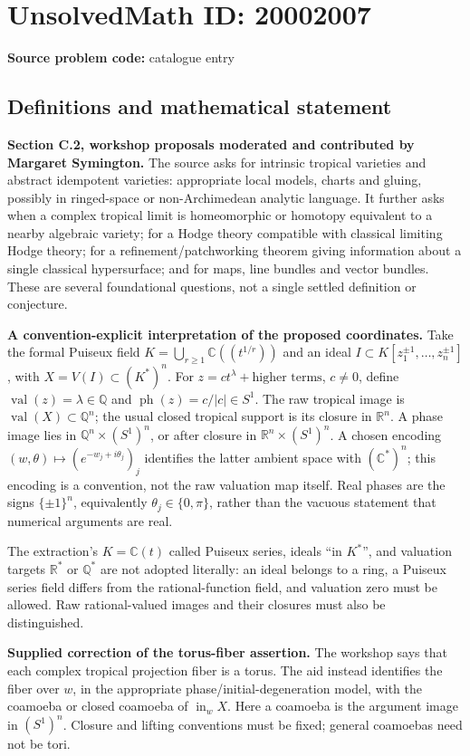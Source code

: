\documentclass[11pt]{article}
\newcommand{\Q}{\mathbb{Q}}
\newcommand{\R}{\mathbb{R}}
\newcommand{\C}{\mathbb{C}}
\begin{document}
\section*{UnsolvedMath ID: 20002007}
\textbf{Source problem code:} catalogue entry
\subsection{Definitions and mathematical statement}
\textbf{Section C.2, workshop proposals moderated and contributed by Margaret Symington.} The source asks for intrinsic tropical varieties and abstract idempotent varieties: appropriate local models, charts and gluing, possibly in ringed-space or non-Archimedean analytic language. It further asks when a complex tropical limit is homeomorphic or homotopy equivalent to a nearby algebraic variety; for a Hodge theory compatible with classical limiting Hodge theory; for a refinement/patchworking theorem giving information about a single classical hypersurface; and for maps, line bundles and vector bundles. These are several foundational questions, not a single settled definition or conjecture.

\textbf{A convention-explicit interpretation of the proposed coordinates.} Take the formal Puiseux field $K=\bigcup_{r\ge1}\C((t^{1/r}))$ and an ideal $I\subset K[z_1^{\pm1},\ldots,z_n^{\pm1}]$, with $X=V(I)\subset(K^*)^n$. For $z=c t^\lambda+\text{higher terms}$, $c\ne0$, define $\operatorname{val}(z)=\lambda\in\Q$ and $\operatorname{ph}(z)=c/|c|\in S^1$. The raw tropical image is $\operatorname{val}(X)\subset\Q^n$; the usual closed tropical support is its closure in $\R^n$. A phase image lies in $\Q^n\times(S^1)^n$, or after closure in $\R^n\times(S^1)^n$. A chosen encoding $(w,\theta)\mapsto(e^{-w_j+i\theta_j})_j$ identifies the latter ambient space with $(\C^*)^n$; this encoding is a convention, not the raw valuation map itself. Real phases are the signs $\{\pm1\}^n$, equivalently $\theta_j\in\{0,\pi\}$, rather than the vacuous statement that numerical arguments are real.

The extraction's $K=\C(t)$ called Puiseux series, ideals ``in $K^*$'', and valuation targets $\R^*$ or $\Q^*$ are not adopted literally: an ideal belongs to a ring, a Puiseux series field differs from the rational-function field, and valuation zero must be allowed. Raw rational-valued images and their closures must also be distinguished.

\textbf{Supplied correction of the torus-fiber assertion.} The workshop says that each complex tropical projection fiber is a torus. The aid instead identifies the fiber over $w$, in the appropriate phase/initial-degeneration model, with the coamoeba or closed coamoeba of $\operatorname{in}_wX$. Here a coamoeba is the argument image in $(S^1)^n$. Closure and lifting conventions must be fixed; general coamoebas need not be tori.
\end{document}
